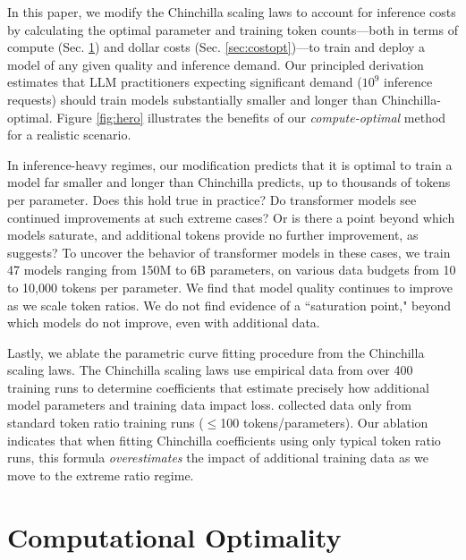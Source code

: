 \documentclass{article}
\theoremstyle{plain}
\theoremstyle{definition}
\theoremstyle{remark}
\renewcommand{\textapprox}{\raisebox{0.5ex}{\texttildelow}}
\begin{document}
In this paper, we modify the Chinchilla scaling laws to account for inference costs by calculating the optimal parameter and training token counts---both in terms of compute (Sec. \ref{sec:compopt}) and dollar costs (Sec. \ref{sec:costopt})---to train and deploy a model of any given quality and inference demand. Our principled derivation estimates that LLM practitioners expecting significant demand (\textapprox$10^9$ inference requests) should train models substantially smaller and longer than Chinchilla-optimal. Figure \ref{fig:hero} illustrates the benefits of our \textit{compute-optimal} method for a realistic scenario.

In inference-heavy regimes, our modification predicts that it is optimal to train a model far smaller and longer than Chinchilla predicts, up to thousands of tokens per parameter. Does this hold true in practice? Do transformer models see continued improvements at such extreme cases? Or is there a point beyond which models saturate, and additional tokens provide no further improvement, as \citet{blogpost} suggests? To uncover the behavior of transformer models in these cases, we train 47 models ranging from 150M to 6B parameters, on various data budgets from 10 to 10,000 tokens per parameter. We find that model quality continues to improve as we scale token ratios. We do not find evidence of a ``saturation point," beyond which models do not improve, even with additional data.

Lastly, we ablate the parametric curve fitting procedure from the Chinchilla scaling laws. The Chinchilla scaling laws use empirical data from over 400 training runs to determine coefficients that estimate precisely how additional model parameters and training data impact loss. \citet{chinchilla} collected data only from standard token ratio training runs ($\leq$\textapprox 100 tokens/parameters). Our ablation indicates that when fitting Chinchilla coefficients using only typical token ratio runs, this formula \textit{overestimates} the impact of additional training data as we move to the extreme ratio regime.

\section{Computational Optimality}
\label{sec:compopt}
\end{document}
